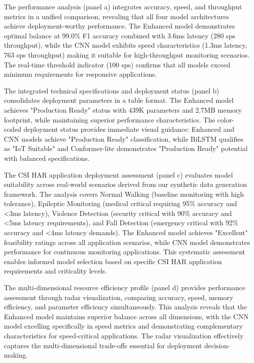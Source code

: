 \documentclass[journal]{IEEEtran}
\begin{document}
The performance analysis (panel a) integrates accuracy, speed, and throughput metrics in a unified comparison, revealing that all four model architectures achieve deployment-worthy performance. The Enhanced model demonstrates optimal balance at 99.0\% F1 accuracy combined with 3.6ms latency (280 sps throughput), while the CNN model exhibits speed characteristics (1.3ms latency, 763 sps throughput) making it suitable for high-throughput monitoring scenarios. The real-time threshold indicator (100 sps) confirms that all models exceed minimum requirements for responsive applications.

The integrated technical specifications and deployment status (panel b) consolidates deployment parameters in a table format. The Enhanced model achieves "Production Ready" status with 439K parameters and 2.7MB memory footprint, while maintaining superior performance characteristics. The color-coded deployment status provides immediate visual guidance: Enhanced and CNN models achieve "Production Ready" classification, while BiLSTM qualifies as "IoT Suitable" and Conformer-lite demonstrates "Production Ready" potential with balanced specifications.

The CSI HAR application deployment assessment (panel c) evaluates model suitability across real-world scenarios derived from our synthetic data generation framework. The analysis covers Normal Walking (baseline monitoring with high tolerance), Epileptic Monitoring (medical critical requiring 95\% accuracy and <3ms latency), Violence Detection (security critical with 90\% accuracy and <5ms latency requirements), and Fall Detection (emergency critical with 92\% accuracy and <4ms latency demands). The Enhanced model achieves "Excellent" feasibility ratings across all application scenarios, while CNN model demonstrates performance for continuous monitoring applications. This systematic assessment enables informed model selection based on specific CSI HAR application requirements and criticality levels.

The multi-dimensional resource efficiency profile (panel d) provides performance assessment through radar visualization, comparing accuracy, speed, memory efficiency, and parameter efficiency simultaneously. This analysis reveals that the Enhanced model maintains superior balance across all dimensions, with the CNN model excelling specifically in speed metrics and demonstrating complementary characteristics for speed-critical applications. The radar visualization effectively captures the multi-dimensional trade-offs essential for deployment decision-making.
\end{document}
